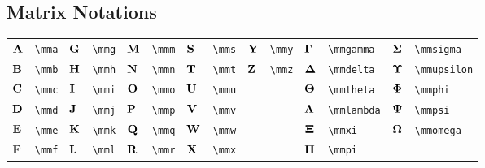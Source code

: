 \documentclass{article}
\begin{document}
\subsection{Matrix Notations}
\begin{tabular}{*{14}{l}}
${\mathbf A}$ & \lstinline`\mma` & ${\mathbf G}$ & \lstinline`\mmg` & ${\mathbf M}$ & \lstinline`\mmm` & ${\mathbf S}$ & \lstinline`\mms` & ${\mathbf Y}$ & \lstinline`\mmy` & ${\bm \Gamma}$ & \lstinline`\mmgamma` & ${\bm \Sigma}$ & \lstinline`\mmsigma`\\
${\mathbf B}$ & \lstinline`\mmb` & ${\mathbf H}$ & \lstinline`\mmh` & ${\mathbf N}$ & \lstinline`\mmn` & ${\mathbf T}$ & \lstinline`\mmt` & ${\mathbf Z}$ & \lstinline`\mmz` & ${\bm \Delta}$ & \lstinline`\mmdelta` & ${\bm \Upsilon}$ & \lstinline`\mmupsilon`\\
${\mathbf C}$ & \lstinline`\mmc` & ${\mathbf I}$ & \lstinline`\mmi` & ${\mathbf O}$ & \lstinline`\mmo` & ${\mathbf U}$ & \lstinline`\mmu` &  &  & ${\bm \Theta}$ & \lstinline`\mmtheta` & ${\bm \Phi}$ & \lstinline`\mmphi`\\
${\mathbf D}$ & \lstinline`\mmd` & ${\mathbf J}$ & \lstinline`\mmj` & ${\mathbf P}$ & \lstinline`\mmp` & ${\mathbf V}$ & \lstinline`\mmv` &  &  & ${\bm \Lambda}$ & \lstinline`\mmlambda` & ${\bm \Psi}$ & \lstinline`\mmpsi`\\
${\mathbf E}$ & \lstinline`\mme` & ${\mathbf K}$ & \lstinline`\mmk` & ${\mathbf Q}$ & \lstinline`\mmq` & ${\mathbf W}$ & \lstinline`\mmw` &  &  & ${\bm \Xi}$ & \lstinline`\mmxi` & ${\bm \Omega}$ & \lstinline`\mmomega`\\
${\mathbf F}$ & \lstinline`\mmf` & ${\mathbf L}$ & \lstinline`\mml` & ${\mathbf R}$ & \lstinline`\mmr` & ${\mathbf X}$ & \lstinline`\mmx` &  &  & ${\bm \Pi}$ & \lstinline`\mmpi` & \\
\end{tabular}
\end{document}
